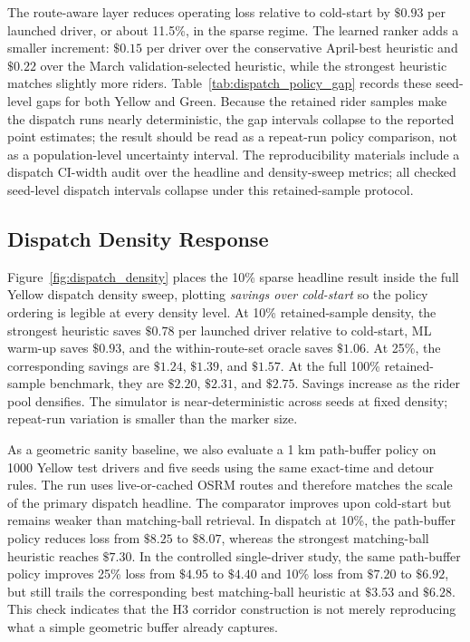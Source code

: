 \documentclass[journal]{IEEEtran}
\begin{document}
The route-aware layer reduces operating loss relative to cold-start by \(\$0.93\) per launched driver, or about 11.5\%, in the sparse regime. The learned ranker adds a smaller increment: \(\$0.15\) per driver over the conservative April-best heuristic and \(\$0.22\) over the March validation-selected heuristic, while the strongest heuristic matches slightly more riders. Table~\ref{tab:dispatch_policy_gap} records these seed-level gaps for both Yellow and Green. Because the retained rider samples make the dispatch runs nearly deterministic, the gap intervals collapse to the reported point estimates; the result should be read as a repeat-run policy comparison, not as a population-level uncertainty interval. The reproducibility materials include a dispatch CI-width audit over the headline and density-sweep metrics; all checked seed-level dispatch intervals collapse under this retained-sample protocol.

\subsection{Dispatch Density Response}
Figure~\ref{fig:dispatch_density} places the 10\% sparse headline result inside the full Yellow dispatch density sweep, plotting \emph{savings over cold-start} so the policy ordering is legible at every density level. At 10\% retained-sample density, the strongest heuristic saves \(\$0.78\) per launched driver relative to cold-start, ML warm-up saves \(\$0.93\), and the within-route-set oracle saves \(\$1.06\). At 25\%, the corresponding savings are \(\$1.24\), \(\$1.39\), and \(\$1.57\). At the full 100\% retained-sample benchmark, they are \(\$2.20\), \(\$2.31\), and \(\$2.75\). Savings increase as the rider pool densifies. The simulator is near-deterministic across seeds at fixed density; repeat-run variation is smaller than the marker size.

As a geometric sanity baseline, we also evaluate a 1 km path-buffer policy on 1000 Yellow test drivers and five seeds using the same exact-time and detour rules. The run uses live-or-cached OSRM routes and therefore matches the scale of the primary dispatch headline. The comparator improves upon cold-start but remains weaker than matching-ball retrieval. In dispatch at 10\%, the path-buffer policy reduces loss from \(\$8.25\) to \(\$8.07\), whereas the strongest matching-ball heuristic reaches \(\$7.30\). In the controlled single-driver study, the same path-buffer policy improves 25\% loss from \(\$4.95\) to \(\$4.40\) and 10\% loss from \(\$7.20\) to \(\$6.92\), but still trails the corresponding best matching-ball heuristic at \(\$3.53\) and \(\$6.28\). This check indicates that the H3 corridor construction is not merely reproducing what a simple geometric buffer already captures.
\end{document}
